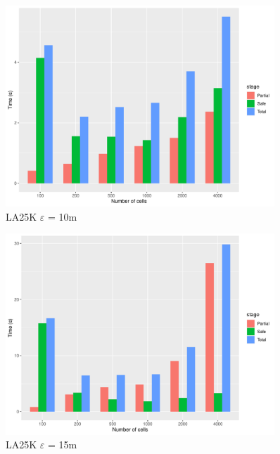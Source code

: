 \documentclass[a4paper,10pt]{article}
\begin{document}
\begin{figure}[h!]
 \centering
 \includegraphics[width=0.9\textwidth]{la25kE10_partitions.pdf}
 \caption{LA25K $\varepsilon$ = 10m}
 \label{fig:la25k10}
\end{figure}

\begin{figure}[h!]
 \centering
 \includegraphics[width=0.9\textwidth]{la25kE15_partitions.pdf}
 \caption{LA25K $\varepsilon$ = 15m}
 \label{fig:la25k15}
\end{figure}
\end{document}
